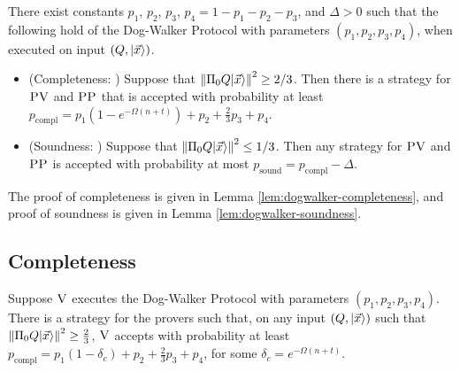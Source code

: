 \begin{theorem}\label{thm:dog-walker}
There exist constants $p_1$, $p_2$, $p_3$, $p_4=1-p_1-p_2-p_3$, and $\Delta>0$ such that the following hold of the Dog-Walker Protocol with parameters $(p_1,p_2,p_3,p_4)$, when executed on input $(Q,|\vec{x}\rangle)$.
\begin{itemize}
\item (Completeness: ) Suppose that $\left\|\Pi_0Q|\vec{x}\rangle\right\|^2\geq 2/3$. Then
  there is a strategy for $\textsc{PV}$ and $\textsc{PP}$ that is accepted with probability at
    least $p_{\mathrm{compl}}=p_1(1-e^{-\Omega(n+t)})+p_2+\frac{2}{3}p_3 +
    p_4$. 
\item (Soundness: ) Suppose that $\left\|\Pi_0Q|\vec{x}\rangle\right\|^2\leq 1/3$. Then any strategy for $\textsc{PV}$ and $\textsc{PP}$ is accepted with probability at most $p_{\mathrm{sound}}=p_{\mathrm{compl}}-\Delta$. 
\end{itemize}
\end{theorem}
\noindent The proof of completeness is given in Lemma \ref{lem:dogwalker-completeness}, and proof of soundness is given in Lemma \ref{lem:dogwalker-soundness}. 




 
 
 \clearpage

\subsection{Completeness}

\begin{lemma}\label{lem:dogwalker-completeness}
Suppose $\textsc{V}$ executes the Dog-Walker Protocol with parameters $(p_1,p_2,p_3,p_4)$.
There is a strategy for the provers such that, on any input $(Q,|\vec{x}\rangle)$
  such that $\left\|\Pi_0 Q|\vec{x}\rangle\right\|^2\geq \frac{2}{3}$, $\textsc{V}$ accepts with
  probability at least
  $p_{\mathrm{compl}}=p_1(1-\delta_c)+p_2+\frac{2}{3}p_3+p_4$, for some $\delta_c = e^{-\Omega(n+t)}$.
\end{lemma}

